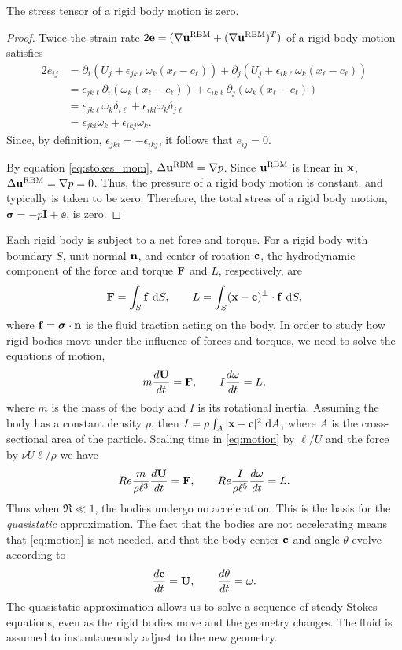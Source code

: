 \begin{proposition}
\label{prop:stress}
The stress tensor of a rigid body motion is zero. 
\end{proposition}
\begin{proof}
Twice the strain rate $2{\mathbf{e}} = (\nabla{\mathbf{u}}^{\text{RBM}} + (\nabla{\mathbf{u}}^{\text{RBM}})^T)$ of a rigid body motion satisfies
\begin{align*}
	 2e_{ij} &= \partial_i\left(U_j + \epsilon_{jk\ell} \omega_k (x_\ell - c_\ell)\right) + \partial_j\left(U_j + \epsilon_{ik\ell}\omega_k (x_\ell - c_\ell)\right)\\
	 &= \epsilon_{jk\ell}\partial_i\left(\omega_k(x_\ell - c_\ell)\right) + \epsilon_{ik\ell}\partial_j\left(\omega_k(x_\ell - c_\ell)\right)\\
	 &=\epsilon_{jk\ell}\omega_k\delta_{i\ell} + \epsilon_{ikl}\omega_k\delta_{j\ell}\\
	 &= \epsilon_{jki}\omega_k + \epsilon_{ikj}\omega_k.
 \end{align*}
 Since, by definition, $\epsilon_{jki} = -\epsilon_{ikj}$, it follows that $e_{ij} = 0$.
 
By equation \eqref{eq:stokes_mom},  $\Delta {\mathbf{u}}^{\text{RBM}} = \nabla p$. Since ${\mathbf{u}}^{\text{RBM}}$ is linear in ${\mathbf{x}}$, $\Delta {\mathbf{u}}^{\text{RBM}} = \nabla p = 0$. Thus, the pressure of a rigid body motion is constant, and typically is taken to be zero. Therefore, the total stress of a rigid body motion, $\bm{\sigma} = -p\mathbf{I} + \ee$, is zero.
\end{proof}

Each rigid body is subject to a net force and torque. For a rigid body with boundary $S$, unit normal ${\mathbf{n}}$, and center of rotation ${\mathbf{c}}$, the hydrodynamic component of the force and torque ${\mathbf{F}}$ and $L$, respectively, are
\[ {\mathbf{F}} = \int_S {\mathbf{f}} ~\text{d}S, \qquad L = \int_S ({\mathbf{x}}-{\mathbf{c}})^\perp \cdot{\mathbf{f}}~\text{d}S,\]
where ${\mathbf{f}} = \bm{\sigma}\cdot{\mathbf{n}}$ is the fluid traction acting on the body. In order to study how rigid bodies move under the influence of forces and torques, we need to solve the equations of motion,
\begin{equation}\label{eq:motion} m \frac{d {\mathbf{U}}}{d t} = {\mathbf{F}}, \qquad  I \frac{d \omega}{dt} = L,\end{equation}
where $m$ is the mass of the body and $I$ is its rotational inertia. Assuming the body has a constant density $\rho$, then $I = \rho\int_A |{\mathbf{x}} - {\mathbf{c}}|^2~\text{d}A$, where $A$ is the cross-sectional area of the particle. Scaling time in \eqref{eq:motion} by $\ell/U$ and the force by $\nu U \ell/\rho$ we have
\[ Re \frac{m}{\rho \ell^3}\frac{d {\mathbf{U}}}{dt} = {\mathbf{F}}, \qquad Re \frac{I}{\rho\ell^5}\frac{d\omega}{dt} = L.\]
Thus when $\Re \ll 1$,  the bodies undergo no acceleration. This is the basis for the \emph{quasistatic} approximation. The fact that the bodies are not accelerating means that \eqref{eq:motion} is not needed, and that the body center ${\mathbf{c}}$ and angle $\theta$  evolve according to
\[ \frac{d {\mathbf{c}}}{dt} = {\mathbf{U}},\qquad \frac{d\theta}{dt} = \omega.\]
The quasistatic approximation allows us to solve a sequence of steady Stokes equations, even as the rigid bodies move and the geometry changes. The fluid is assumed to instantaneously adjust to the new geometry.



